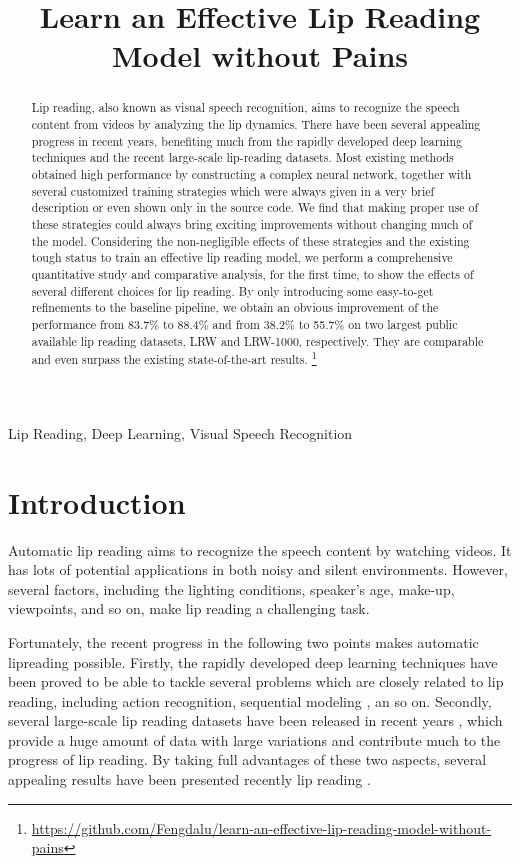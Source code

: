 \documentclass{article}
\title{Learn an Effective Lip Reading Model without Pains}
\begin{document}
\maketitle
\begin{abstract}
Lip reading, also known as visual speech recognition, aims to recognize the speech content from videos by analyzing the lip dynamics. There have been several appealing progress in recent years, benefiting much from the rapidly developed deep learning techniques and the recent large-scale lip-reading datasets. Most existing methods obtained high performance by constructing a complex neural network, together with several customized training strategies which were always given in a very brief description or even shown only in the source code. We find that making proper use of these strategies could always bring exciting improvements without changing much of the model. Considering the non-negligible effects of these strategies and the 
existing tough status to train an effective lip reading model, we perform a comprehensive quantitative study and comparative analysis, for the first time, to show the effects of several different choices for lip reading. By only introducing some easy-to-get refinements to the baseline pipeline, we obtain an obvious improvement of the performance from 83.7\% to 88.4\% and from 38.2\% to 55.7\% on two largest public available lip reading datasets, LRW and LRW-1000, respectively. They are comparable and even surpass the existing state-of-the-art results. \footnote{\url{https://github.com/Fengdalu/learn-an-effective-lip-reading-model-without-pains}}
\end{abstract}
\begin{keywords}
Lip Reading, Deep Learning, Visual Speech Recognition
\end{keywords}
\section{Introduction}
\label{sec:intro}

Automatic lip reading aims to recognize the speech content by watching videos. It has lots of potential applications in both noisy and silent environments. However, several factors, including the lighting conditions, speaker's age, make-up, viewpoints, and so on, make lip reading a challenging task.

Fortunately, the recent progress in the following two points makes automatic lipreading possible. Firstly, the rapidly developed deep learning techniques have been proved to be able to tackle several problems which are closely related to lip reading, including action recognition\cite{wang2018non,feichtenhofer2019slowfast,qiu2017learning}, sequential modeling \cite{sutskever2014sequence,devlin2018bert,vaswani2017attention}, an so on. Secondly, several large-scale lip reading datasets have been released in recent years \cite{chung2017lip,yang2019lrw,chung2017liplrw}, which provide a huge amount of data with large variations and contribute much to the progress of lip reading. By taking full advantages of these two aspects, several appealing results have been presented recently lip reading \cite{assael2016lipnet, stafylakiscombining, martinez2020lipreading}.
\end{document}
